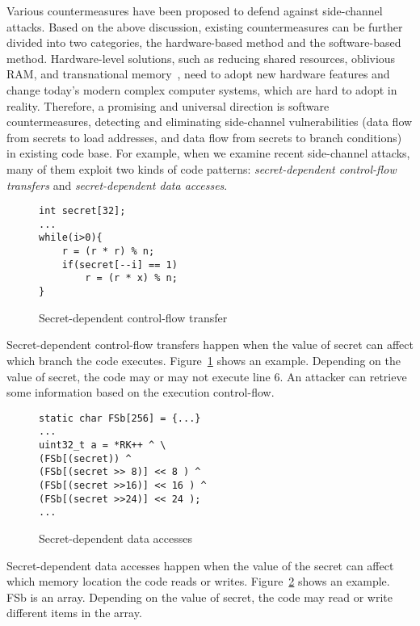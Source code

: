 Various countermeasures have been proposed to defend against side-channel attacks. Based on the above discussion, existing countermeasures can be further divided into two categories, the hardware-based method and the software-based method. Hardware-level solutions, such as reducing shared resources, oblivious RAM, and transnational memory~\cite{203878,217537,shih2017t,Zhang:2015:HDL:2775054.2694372}, need to adopt new hardware features and change  today's modern complex computer systems, which are hard to adopt in reality. Therefore, a promising and universal direction is software countermeasures, detecting and eliminating side-channel vulnerabilities (data flow from secrets to load addresses, and data flow from secrets to branch conditions) in existing code base. For example, when we examine recent side-channel attacks, many of them exploit two kinds of code patterns: \emph{secret-dependent control-flow transfers} and \emph{secret-dependent data accesses}.
\begin{figure}[h]
    \begin{lstlisting}[xleftmargin=.32\textwidth, xrightmargin=.32\textwidth]
int secret[32];
...
while(i>0){
    r = (r * r) % n;
    if(secret[--i] == 1)
        r = (r * x) % n;   
}
\end{lstlisting}
    \caption{Secret-dependent control-flow transfer}
    \label{fig:secret:cf}
\end{figure}

Secret-dependent control-flow transfers happen when the value of secret can affect which branch the code executes. Figure~\ref{fig:secret:cf} shows an example. Depending on the value of \textsf{secret}, the code may or may not execute line 6. An attacker can retrieve some information based on the execution control-flow.

\begin{figure}[h]
    \begin{lstlisting}[xleftmargin=.32\textwidth, xrightmargin=.32\textwidth]
static char FSb[256] = {...}
... 
uint32_t a = *RK++ ^ \ 
(FSb[(secret)) ^
(FSb[(secret >> 8)] << 8 ) ^
(FSb[(secret >>16)] << 16 ) ^
(FSb[(secret >>24)] << 24 );
...
\end{lstlisting}
    \caption{Secret-dependent data accesses}
    \label{fig:secret:da}
\end{figure}

Secret-dependent data accesses happen when the value of the secret can affect which memory location the code reads or writes. Figure~\ref{fig:secret:da} shows an example. \textsf{FSb} is an array. Depending on the value of \textsf{secret}, the code may read or write different items in the array.

